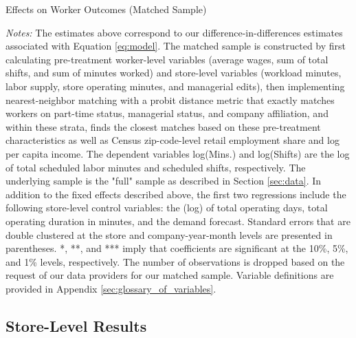 \documentclass[letterpaper,11pt,leqno]{article}
\theoremstyle{paper}
\newcommand{\note}[2][]{\parbox{\textwidth}{\footnotesize\vspace*{10pt}\textit{#1}#2}}
\begin{document}
\begin{singlespace}
\begin{table}[h]
\caption{Effects on Worker Outcomes (Matched Sample)}

\note{\scriptsize \textit{Notes: } The estimates above correspond to our difference-in-differences estimates associated with Equation \ref{eq:model}. The matched sample is constructed by first calculating pre-treatment worker-level variables (average wages, sum of total shifts, and sum of minutes worked) and store-level variables (workload minutes, labor supply, store operating minutes, and managerial edits), then implementing nearest-neighbor matching with a probit distance metric that exactly matches workers on part-time status, managerial status, and company affiliation, and within these strata, finds the closest matches based on these pre-treatment characteristics as well as Census zip-code-level retail employment share and log per capita income. The dependent variables log(Mins.) and log(Shifts) are the log of total scheduled labor minutes and scheduled shifts, respectively. The underlying sample is the "full" sample as described in Section \ref{sec:data}.
In addition to the fixed effects described above, the first two regressions include the following store-level control variables: the (log) of total operating days, total operating duration in minutes, and the demand forecast. Standard errors that are double clustered at the store and company-year-month levels are presented in parentheses. *, **, and *** imply that coefficients are significant at the 10\%, 5\%, and 1\% levels, respectively. The number of observations is dropped based on the request of our data providers for our matched sample. Variable definitions are provided in Appendix \ref{sec:glossary_of_variables}.}
\label{table:worker_level_matched}
\end{table}
\end{singlespace}

\newpage 
\subsection{Store-Level Results}
\end{document}

